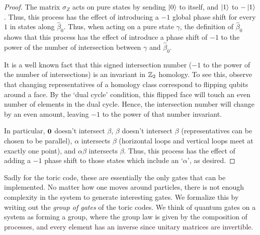 \documentclass{article}
\theoremstyle{definition}
\numberwithin{figure}{section}
\begin{document}
\begin{proof}
The matrix $\sigma_Z$ acts on pure states by sending $\left|0\right>$ to itself, and $\left|1\right>$ to $-\left|1\right>$. Thus, this process has the effect of introducing a $-1$ global phase shift for every $1$ in states along $\widehat{\beta}_0$. Thus, when acting on a pure state $\gamma$, the definition of $\widehat{\beta}_0$ shows that this process has the effect of introduce a phase shift of $-1$ to the power of the number of intersection between $\gamma$ and $\widehat{\beta}_0$.

It is a well known fact that this signed intersection number ($-1$ to the power of the number of intersections) is an invariant in $\mathbb{Z}_2$ homology. To see this, observe that changing representatives of a homology class correspond to flipping qubits around a face. By the `dual cycle' condition, this flipped face will touch an even number of elements in the dual cycle. Hence, the intersection number will change by an even amount, leaving $-1$ to the power of that number invariant.

In particular, $\bold{0}$ doesn't intersect $\beta$, $\beta$ doesn't intersect $\beta$ (representatives can be chosen to be parallel), $\alpha$ intersects $\beta$ (horizontal loops and vertical loops meet at exactly one point), and $\alpha\beta$ intersects $\beta$. Thus, this process has the effect of adding a $-1$ phase shift to those states which include an `$\alpha$', as desired.
\end{proof}

Sadly for the toric code, these are essentially the only gates that can be implemented. No matter how one moves around particles, there is not enough complexity in the system to generate interesting gates. We formalize this by writing out the \textit{group of gates} of the toric codes. We think of quantum gates on a system as forming a group, where the group law is given by the composition of processes, and every element has an inverse since unitary matrices are invertible.
\end{document}
